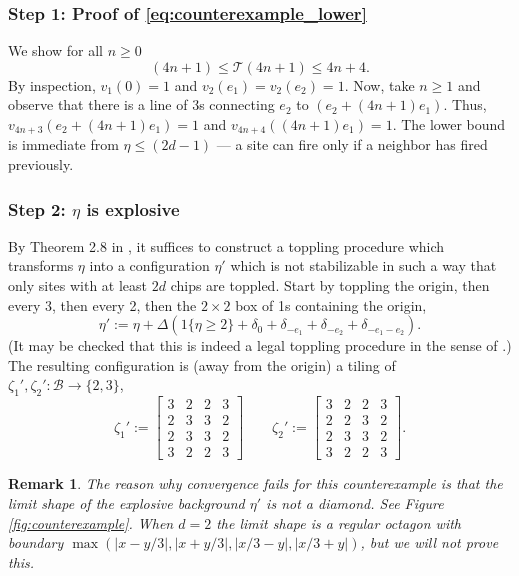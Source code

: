 \documentclass[aap]{imsart}
\newtheorem{remark}{Remark}
\begin{document}
\subsubsection*{Step 1: Proof of \eqref{eq:counterexample_lower}}
We show for all $n \geq 0$
\begin{equation}
(4 n + 1) \leq \mathcal{T}(4 n + 1) \leq 4 n + 4.
\end{equation} 
By inspection, $v_1(0) = 1$ and $v_2(e_1) = v_2(e_2) = 1$. Now, take $n \geq 1$
and observe that there is a line of 3s connecting $e_2$ to $(e_2 + (4 n + 1)e_1)$.
Thus, $v_{4 n+3}(e_2 + (4 n + 1)e_1) = 1$ and $v_{4 n+4}( (4 n + 1)e_1) = 1$.
The lower bound is immediate from $\eta \leq (2d - 1)$ --- a site can fire only if a neighbor has fired previously.


\subsubsection*{Step 2: $\eta$ is explosive}
By Theorem 2.8 in \cite{fey2009stabilizability}, 
it suffices to construct a toppling procedure
which transforms  $\eta$ into a configuration $\eta'$ which is not stabilizable
in such a way that only sites with at least $2 d$ chips are toppled. 
Start by toppling the origin, then every 3, then every 2, then the $2 \times 2$ box of 1s 
containing the origin,
\[
\eta' := \eta + \Delta \left( 1\{\eta \geq 2\} + \delta_0 + \delta_{-e_1} + \delta_{-e_2} + \delta_{-e_1-e_2} \right).
\]
(It may be checked that this is indeed a legal toppling procedure in the sense of \cite{fey2009stabilizability}.)
The resulting configuration is (away from the origin) a tiling of $\zeta_1',\zeta_2' : \mathcal{B} \to \{2, 3\}$, 
\begin{equation} \label{eq:modified_checkerboard}
\zeta_1' := 
\begin{bmatrix}
3 & 2 & 2 & 3 \\
2 & 3 & 3 & 2 \\
2 & 3 & 3 & 2  \\
3 & 2 & 2 & 3
\end{bmatrix}
\qquad 
\zeta_2' := 
\begin{bmatrix}
3 & 2 & 2 & 3 \\
2 & 2 & 3 & 2 \\
2 & 3 & 3 & 2  \\
3 & 2 & 2 & 3
\end{bmatrix}.
\end{equation}
\begin{remark}
	The reason why convergence fails for this counterexample is that the limit 
	shape of the explosive background $\eta'$ is not a diamond. See Figure \ref{fig:counterexample}.
	When $d=2$ the limit shape is a regular octagon with boundary $\max(|x-y/3|, |x+y/3|, |x/3 - y|, |x/3 + y|)$, but we will not prove this. 
\end{remark}
\end{document}
